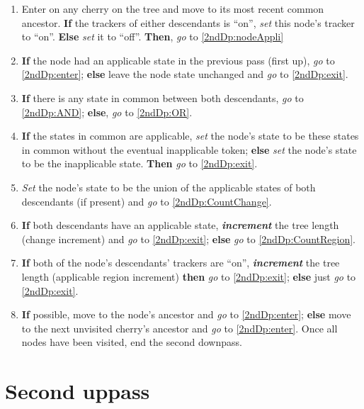 \documentclass[a4paper,12pt]{article}
\begin{document}
\begin{enumerate}

    \item \label{2ndDp:entry} Enter on any cherry on the tree and move to its most recent common ancestor. \textbf{If} the trackers of either descendants is ``on'', \textit{set} this node's tracker to ``on''. \textbf{Else} \textit{set} it to ``off''. \textbf{Then}, \textit{go} to \ref{2ndDp:nodeAppli}
    \item \label{2ndDp:nodeAppli} \textbf{If} the node had an applicable state in the previous pass (first up), \textit{go} to \ref{2ndDp:enter}; \textbf{else} leave the node state unchanged and \textit{go} to \ref{2ndDp:exit}.
    \item \label{2ndDp:enter} \textbf{If} there is any state in common between both descendants, \textit{go} to \ref{2ndDp:AND}; \textbf{else}, \textit{go} to \ref{2ndDp:OR}.
    \item \label{2ndDp:AND} \textbf{If} the states in common are applicable, \textit{set} the node's state to be these states in common without the eventual inapplicable token; \textbf{else} \textit{set} the node's state to be the inapplicable state. \textbf{Then} \textit{go} to \ref{2ndDp:exit}. 
    \item \label{2ndDp:OR} \textit{Set} the node's state to be the union of the applicable states of both descendants (if present) and \textit{go} to \ref{2ndDp:CountChange}.
    \item \label{2ndDp:CountChange} \textbf{If} both descendants have an applicable state, \textbf{\textit{increment}} the tree length (change increment) and \textit{go} to \ref{2ndDp:exit}; \textbf{else} \textit{go} to \ref{2ndDp:CountRegion}.
    \item \label{2ndDp:CountRegion} \textbf{If} both of the node's descendants' trackers are ``on'', \textbf{\textit{increment}} the tree length (applicable region increment) \textbf{then} \textit{go} to \ref{2ndDp:exit}; \textbf{else} just \textit{go} to \ref{2ndDp:exit}.
    \item \label{2ndDp:exit} \textbf{If} possible, move to the node's ancestor and \textit{go} to \ref{2ndDp:enter}; \textbf{else} move to the next unvisited cherry's ancestor and \textit{go} to \ref{2ndDp:enter}. Once all nodes have been visited, end the second downpass.
\end{enumerate}

\section{Second uppass} \label{2ndUp}
\end{document}
